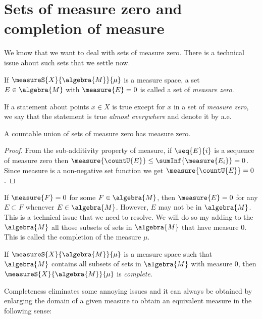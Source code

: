 \section{Sets of measure zero and completion of measure}
We know that we want to deal with sets of measure zero. There is a technical issue about such sets
that we settle now.
\begin{Definition}[name=Sets of measure zero]
    If $\measureS{X}{\algebra{M}}{\mu}$ is a measure space, a set $E \in \algebra{M}$ with
    $\measure{E} = 0$ is called a set of \emph{measure zero}. 
\end{Definition}
\begin{Definition}[name=Almost everywhere]
    If a statement about points $x \in X$ is true except for $x$ in a set of \emph{measure zero}, we
    say that the statement is true \emph{almost everywhere} and denote it by a.e.
\end{Definition}
\begin{Proposition}[name=Countable union of sets of measure $0$]\label{prop:count_union_meas_0}
    A countable union of sets of measure zero has measure zero.
\end{Proposition}
\begin{proof}
    From the sub-additivity property of measure, if $\seq{E}{i}$ is a sequence of measure zero then
    $\measure{\countU{E}} \leq \sumInf{\measure{E_i}} = 0$. Since measure is a non-negative set
    function we get $\measure{\countU{E}} = 0$.
\end{proof}
\begin{Remark}
    If $\measure{F} = 0$ for some $F \in \algebra{M}$, then $\measure{E} = 0$ for any $E \subset F$
    whenever $E \in \algebra{M}$. However, $E$ may not be in $\algebra{M}$. This is a technical
    issue that we need to resolve. We will do so my adding to the $\algebra{M}$ all those
    subsets of sets in $\algebra{M}$ that have measure $0$. This is called the completion of the
    measure $\mu$.
\end{Remark}
\begin{Definition}[name=Complete measure space]
    If $\measureS{X}{\algebra{M}}{\mu}$ is a measure space such that $\algebra{M}$ contains all
    subsets of sets in $\algebra{M}$ with measure $0$, then $\measureS{X}{\algebra{M}}{\mu}$ is
    \emph{complete}.
\end{Definition}
Completeness eliminates some annoying issues and it can always be obtained by enlarging the domain of
a given measure to obtain an equivalent measure in the following sense:
